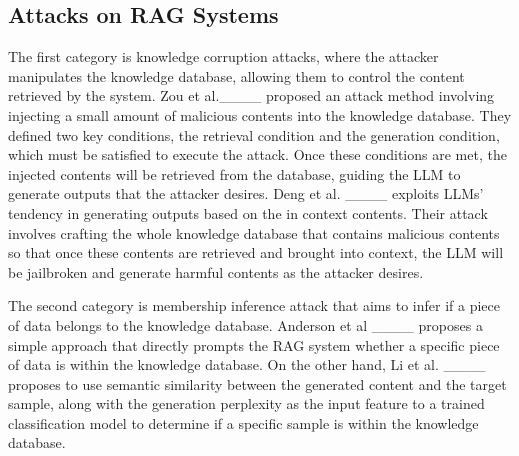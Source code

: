 \subsection{Attacks on RAG Systems}
The first category is knowledge corruption attacks, where the attacker manipulates the knowledge database, allowing them to control the content retrieved by the system. Zou et al.____ proposed an attack method involving injecting a small amount of malicious contents into the knowledge database. They defined two key conditions, the retrieval condition and the generation condition, which must be satisfied to execute the attack. Once these conditions are met, the injected contents will be retrieved from the database, guiding the LLM to generate outputs that the attacker desires. Deng et al. ____ exploits LLMs' tendency in generating outputs based on the in context contents. Their attack involves crafting the whole knowledge database that contains malicious contents so that once these contents are retrieved and brought into context, the LLM will be jailbroken and generate harmful contents as the attacker desires. 

The second category is membership inference attack that aims to infer if a piece of data belongs to the knowledge database. Anderson et al ____ proposes a simple approach that directly prompts the RAG system whether a specific piece of data is within the knowledge database. On the other hand, Li et al. ____ proposes to use semantic similarity between the generated content and the target sample, along with the generation perplexity as the input feature to a trained classification model to determine if a specific sample is within the knowledge database.

